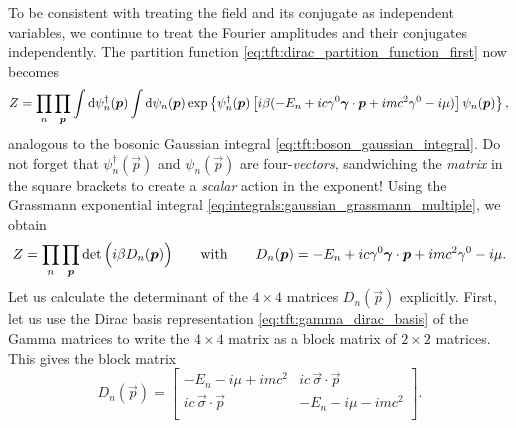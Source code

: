 To be consistent with treating the field and its conjugate as independent variables, we continue to treat the Fourier amplitudes and their conjugates independently.
The partition function \eqref{eq:tft:dirac_partition_function_first} now becomes 
\begin{equation}
	Z %
	  = \prod_n \prod_\vec{p} \int \dif \psi^\dagger_n(\vec{p}) \int \dif \psi_n(\vec{p}) 
	  \exp \left\{ \psi^\dagger_n(\vec{p}) \left[ i \beta ( -E_n + i c \gamma^0 \vec{\gamma} \cdot \vec{p} + i mc^2 \gamma^0 - i \mu ) \right] \psi_n(\vec{p}) \right\} , \\
\label{eq:tft:fermion_gaussian_integral}
\end{equation}
analogous to the bosonic Gaussian integral \eqref{eq:tft:boson_gaussian_integral}.
Do not forget that $\psi^\dagger_n(\vec{p})$ and $\psi_n(\vec{p})$ are four-\emph{vectors}, sandwiching the \emph{matrix} in the square brackets to create a \emph{scalar} action in the exponent!
Using the Grassmann exponential integral \eqref{eq:integrals:gaussian_grassmann_multiple}, we obtain
\begin{equation}
	Z = \prod_n \prod_{\bm{p}} \operatorname{det} \Big( i \beta D_n({\bm{p}}) \Big)
	\qquad \text{with} \qquad
	D_n({\bm{p}}) = -E_n + i c \gamma^0 {\bm{\gamma}} \cdot {\bm{p}} + i mc^2 \gamma^0 - i \mu .
\label{eq:tft:fermionic_partition_function_before_log}
\end{equation}
Let us calculate the determinant of the $4 \times 4$ matrices $D_n(\vec{p})$ explicitly.
First, let us use the Dirac basis representation \eqref{eq:tft:gamma_dirac_basis} of the Gamma matrices to write the $4 \times 4$ matrix as a block matrix of $2 \times 2$ matrices.
This gives the block matrix
\begin{equation}
	D_n(\vec{p}) = \begin{bmatrix}
	                   -E_n - i \mu + i m c^2         & i c \, \vec{\sigma} \cdot \vec{p}    \\ 
	                   i c \, \vec{\sigma} \cdot \vec{p} & -E_n - i \mu - i m c^2 \\ 
	               \end{bmatrix} .
\label{eq:tft:matrix_Dnp}
\end{equation}

